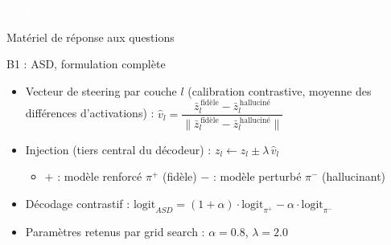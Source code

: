 \appendix
\backupbegin

\begin{frame}
  \vspace*{2.6cm}
  \centering
  {\textcolor{white}{Backups}\par}
  \vspace{0.3cm}
  {\large\textcolor{AubayStone}{Matériel de réponse aux questions}\par}
\end{frame}

\begin{frame}{B1 : ASD, formulation complète}
  \begin{itemize}
    \item Vecteur de steering par couche $l$ (calibration contrastive, moyenne des différences d'activations) :
      $\hat{v}_l = \dfrac{\bar{z}_l^{\,\text{fidèle}} - \bar{z}_l^{\,\text{halluciné}}}{\lVert \bar{z}_l^{\,\text{fidèle}} - \bar{z}_l^{\,\text{halluciné}} \rVert}$
    \item Injection (tiers central du décodeur) : $z_l \leftarrow z_l \pm \lambda\,\hat{v}_l$
      \begin{itemize}
        \item $+$ : modèle renforcé $\pi^+$ (fidèle) \quad $-$ : modèle perturbé $\pi^-$ (hallucinant)
      \end{itemize}
    \item Décodage contrastif : $\mathrm{logit}_{ASD} = (1+\alpha)\cdot\mathrm{logit}_{\pi^+} - \alpha\cdot\mathrm{logit}_{\pi^-}$
    \item Paramètres retenus par grid search : $\alpha = 0.8$, $\lambda = 2.0$
  \end{itemize}
  \vspace{0.2cm}
\end{frame}


